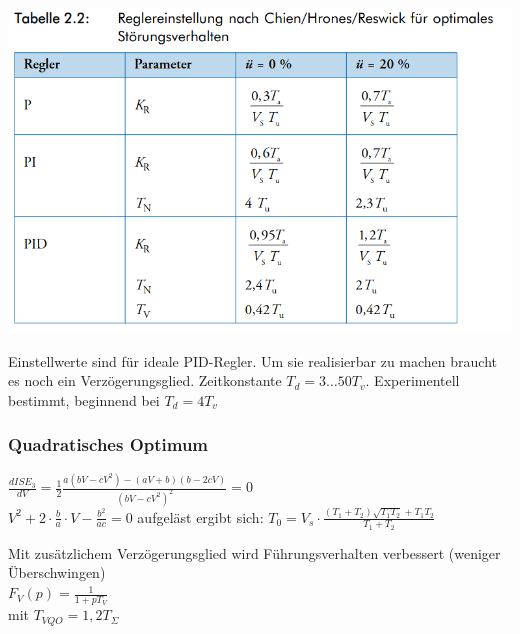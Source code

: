 \includegraphics[scale= 0.5]{themen/pict/chien-stoerung.png}

Einstellwerte sind für ideale PID-Regler. Um sie realisierbar zu machen braucht es noch ein Verzögerungsglied.
Zeitkonstante $T_d = 3 \dots 50 T_v$. Experimentell bestimmt, beginnend bei $T_d = 4 T_v$

\subsubsection{Quadratisches Optimum }

 \begin{minipage}{0.45\textwidth}
  $\frac{dISE_3}{dV} = \frac{1}{2}\frac{a(bV - cV^2)-(aV+b)(b-2cV)}{(bV-cV^2)^2} = 0 $ \\
 $ V^2 + 2\cdot \frac{b}{a}\cdot V - \frac{b^2}{ac} = 0$
 aufgeläst ergibt sich:
 $ T_0 = V_s \cdot \frac{(T_1+T_2)\sqrt{T_1T_2}+T_1T_2}{T_1+T_2}$


 Mit zusätzlichem Verzögerungsglied wird Führungsverhalten verbessert (weniger Überschwingen)\\
 $F_V(p) = \frac{1}{1+pT_V} $ \\
 mit $T_{VQO} = 1,2 T_{\Sigma}$
 \end{minipage}
 \begin{minipage}{0.45\textwidth}

 \end{minipage}

